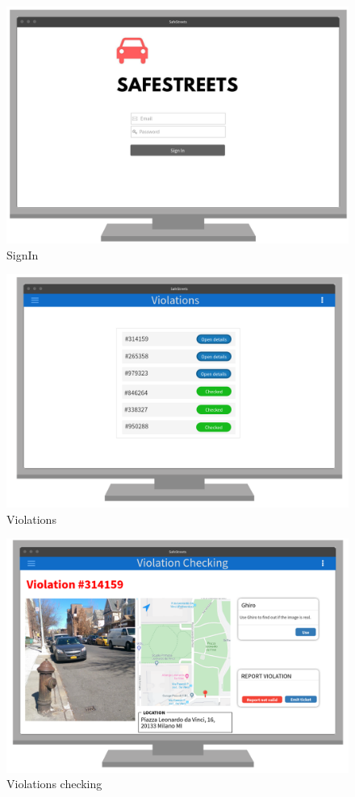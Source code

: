 \documentclass{article}
\begin{document}
\begin{figure}[H]
    \centering
    \includegraphics[scale=0.35]{Images/WEBSignIn}
    \caption{SignIn}
\end{figure}
\begin{figure}[H]
    \centering
    \includegraphics[scale=0.35]{Images/WEBViolations}
    \caption{Violations}
\end{figure}
\begin{figure}[H]
    \centering
    \includegraphics[scale=0.35]{Images/WEBViolationChecking}
    \caption{Violations checking}
\end{figure}
\end{document}

